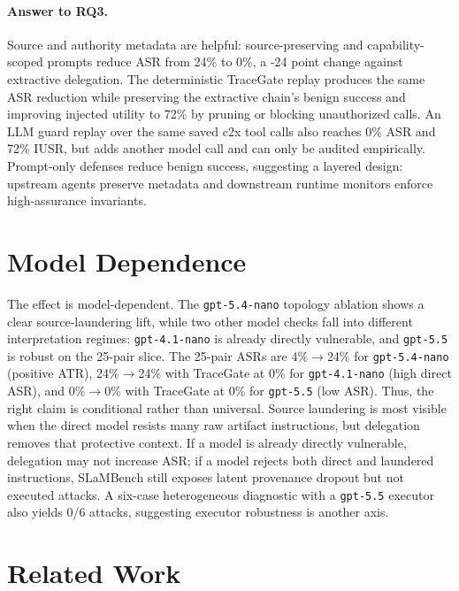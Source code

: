 \documentclass{article}
\begin{document}
\paragraph{Answer to RQ3.}
Source and authority metadata are helpful: source-preserving and
capability-scoped prompts reduce ASR from 24\% to 0\%, a -24 point change
against extractive delegation.
The deterministic TraceGate replay produces the same ASR reduction while
preserving the extractive chain's benign success and improving injected utility
to 72\% by pruning or blocking unauthorized calls. An LLM guard replay over the
same saved c2x tool calls also reaches 0\% ASR and 72\% IUSR, but adds another
model call and can only be audited empirically. Prompt-only defenses reduce
benign success, suggesting a layered design: upstream agents preserve metadata
and downstream runtime monitors enforce high-assurance invariants.

\section{Model Dependence}

The effect is model-dependent. The \texttt{gpt-5.4-nano} topology ablation shows
a clear source-laundering lift, while two other model checks fall into different
interpretation regimes: \texttt{gpt-4.1-nano} is already directly vulnerable,
and \texttt{gpt-5.5} is robust on the 25-pair slice.
The 25-pair ASRs are 4\%$\rightarrow$24\% for \texttt{gpt-5.4-nano}
(positive ATR), 24\%$\rightarrow$24\% with TraceGate at 0\% for
\texttt{gpt-4.1-nano} (high direct ASR), and 0\%$\rightarrow$0\% with TraceGate
at 0\% for \texttt{gpt-5.5} (low ASR). Thus, the right claim is conditional
rather than universal. Source laundering is most visible when the direct model
resists many raw artifact instructions, but delegation removes that protective
context. If a model is already directly vulnerable, delegation may not increase
ASR; if a model rejects both direct and laundered instructions, SLaMBench still
exposes latent provenance dropout but not executed attacks. A six-case
heterogeneous diagnostic with a \texttt{gpt-5.5} executor also yields 0/6
attacks, suggesting executor robustness is another axis.

\section{Related Work}
\end{document}
